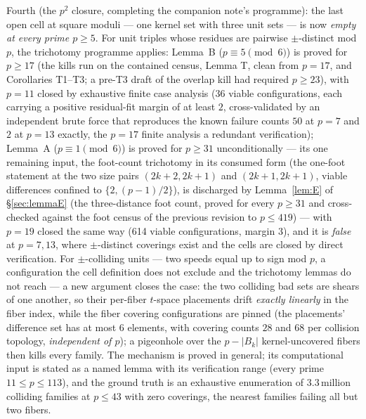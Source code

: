 \begin{remark}
\medskip
Fourth (the $p^2$ closure, completing the companion note's programme):
the last open cell at square moduli --- one kernel set with three unit
sets --- is now \emph{empty at every prime $p\ge5$}.  For unit triples
whose residues are pairwise $\pm$-distinct mod $p$, the trichotomy
programme applies: Lemma~B ($p\equiv5\pmod6$) is proved for $p\ge17$
(the kills run on the contained census, Lemma T, clean from $p=17$, and
Corollaries T1--T3; a pre-T3 draft of the overlap kill had required
$p\ge23$), with $p=11$ closed by exhaustive finite case analysis (36
viable configurations, each carrying a positive residual-fit margin of at
least $2$, cross-validated by an independent brute force that reproduces
the known failure counts $50$ at $p=7$ and $2$ at $p=13$ exactly, the
$p=17$ finite analysis a redundant
verification); Lemma~A ($p\equiv1\pmod6$) is proved for $p\ge31$
unconditionally --- its one remaining input, the foot-count trichotomy
in its consumed form (the one-foot statement at the two size pairs
$(2k{+}2,2k{+}1)$ and $(2k{+}1,2k{+}1)$, viable differences confined to
$\{2,(p-1)/2\}$), is discharged by Lemma~\ref{lem:E} of
\S\ref{sec:lemmaE} (the three-distance foot count, proved for every
$p\ge31$ and cross-checked against the foot census of the previous
revision to $p\le419$) --- with $p=19$ closed the same way (614
viable configurations, margin $3$), and it is \emph{false} at $p=7,13$,
where $\pm$-distinct coverings exist and the cells are closed by direct
verification. For $\pm$-colliding units ---
two speeds equal up to sign mod $p$, a configuration the cell definition
does not exclude and the trichotomy lemmas do not reach --- a new argument
closes the case: the two colliding bad sets are shears of one another, so
their per-fiber $t$-space placements drift \emph{exactly linearly} in the
fiber index, while the fiber covering configurations are pinned (the
placements' difference set has at most $6$ elements, with covering counts
$28$ and $68$ per collision topology, \emph{independent of $p$}); a
pigeonhole over the $p-|B_k|$ kernel-uncovered fibers then kills every
family.  The mechanism is proved in general; its computational input is
stated as a named lemma with its verification range (every prime
$11\le p\le 113$), and the ground truth is an exhaustive enumeration of
$3.3$\,million colliding families at $p\le43$ with zero coverings, the
nearest families failing all but two fibers.


\end{remark}
